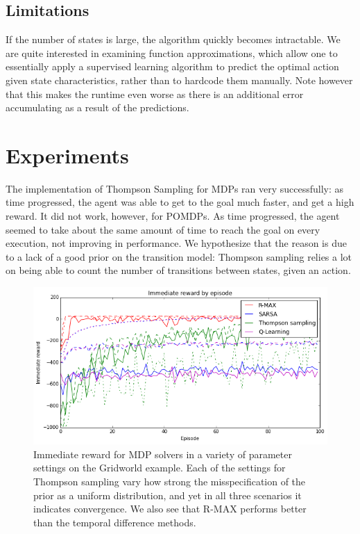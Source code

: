 \documentclass{pset}
\begin{document}
\subsection{Limitations}
If the number of states is large, the algorithm quickly becomes intractable. We
are quite interested in examining function approximations, which allow one to
essentially apply a supervised learning algorithm to predict the optimal action
given state characteristics, rather than to hardcode them manually. Note
however that this makes the runtime even worse as there is an additional error
accumulating as a result of the predictions.

\section{Experiments}
The implementation of Thompson Sampling for MDPs ran very successfully: as time
progressed, the agent was able to get to the goal much faster, and get a high
reward. It did not work, however, for POMDPs. As time progressed, the agent seemed
to take about the same amount of time to reach the goal on every execution, not
improving in performance. We hypothesize that the reason is due to a lack of
a good prior on the transition model: Thompson sampling relies a lot on being
able to count the number of transitions between states, given an action.

\begin{figure}[ht]
\begin{center}
\centerline{\includegraphics[width=\textwidth]{img/mdp_imm_rewards.png}}
\caption{Immediate reward for MDP solvers in a variety of parameter settings on
the Gridworld example.
Each of the settings for Thompson sampling vary how strong the misspecification of the
prior as a uniform distribution, and yet in all three scenarios it indicates
convergence. We also see that R-MAX performs better than the temporal difference methods.}
\end{center}
\end{figure}
\end{document}
